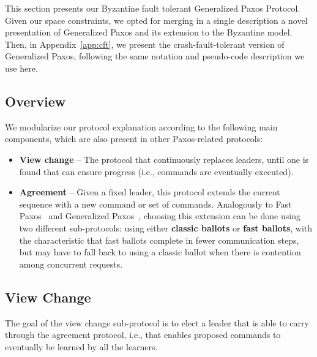 This section presents our Byzantine fault tolerant Generalized Paxos
Protocol. Given our space constraints, we opted for merging in a
single description a novel presentation of Generalized Paxos and its
extension to the Byzantine model. Then, in Appendix~\ref{app:cft}, we
present the crash-fault-tolerant version of Generalized Paxos,
following the same notation and pseudo-code description we use here.

\subsection{Overview}

We modularize our protocol explanation according to the following main components, which are also present in other Paxos-related protocols:

\begin{itemize}

\item
{\bf View change} -- The protocol that continuously replaces leaders, until one is found that can ensure progress (i.e., commands are eventually executed).

\item
{\bf Agreement} -- Given a fixed leader, this protocol extends the current sequence with a new command or set of commands. Analogously to Fast Paxos~\cite{fast:paxos} and Generalized Paxos~\cite{generalized:paxos}, choosing this extension can be done using two different sub-protocols: using either {\bf classic ballots} or {\bf fast ballots}, with the characteristic that fast ballots complete in fewer communication steps, but may have to fall back to using a classic ballot when there is contention among concurrent requests.

\end{itemize}

\subsection{View Change} 

The goal of the view change sub-protocol is to elect a leader that is able to carry through the agreement protocol, i.e., that enables proposed commands to eventually be learned by all the learners.

